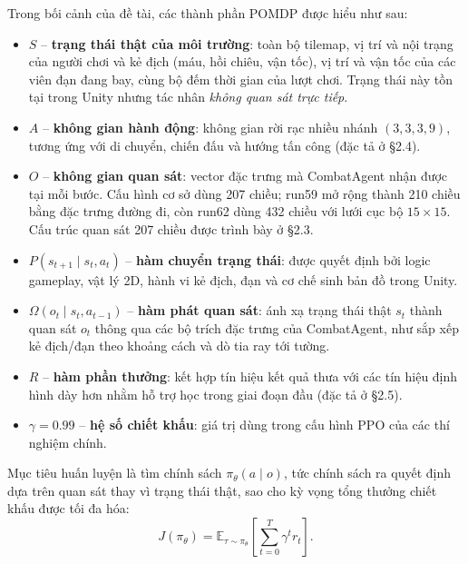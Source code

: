 Trong bối cảnh của đề tài, các thành phần POMDP được hiểu như sau:
\begin{itemize}
    \item $S$ -- \textbf{trạng thái thật của môi trường}: toàn bộ tilemap, vị trí và nội trạng của người chơi và kẻ địch (máu, hồi chiêu, vận tốc), vị trí và vận tốc của các viên đạn đang bay, cùng bộ đếm thời gian của lượt chơi. Trạng thái này tồn tại trong Unity nhưng tác nhân \emph{không quan sát trực tiếp}.
    \item $A$ -- \textbf{không gian hành động}: không gian rời rạc nhiều nhánh $(3,3,3,9)$, tương ứng với di chuyển, chiến đấu và hướng tấn công (đặc tả ở §2.4).
    \item $O$ -- \textbf{không gian quan sát}: vector đặc trưng mà CombatAgent nhận được tại mỗi bước. Cấu hình cơ sở dùng 207 chiều; run59 mở rộng thành 210 chiều bằng đặc trưng đường đi, còn run62 dùng 432 chiều với lưới cục bộ $15\times15$. Cấu trúc quan sát 207 chiều được trình bày ở §2.3.
    \item $P(s_{t+1} \mid s_t, a_t)$ -- \textbf{hàm chuyển trạng thái}: được quyết định bởi logic gameplay, vật lý 2D, hành vi kẻ địch, đạn và cơ chế sinh bản đồ trong Unity.
    \item $\Omega(o_t \mid s_t, a_{t-1})$ -- \textbf{hàm phát quan sát}: ánh xạ trạng thái thật $s_t$ thành quan sát $o_t$ thông qua các bộ trích đặc trưng của CombatAgent, như sắp xếp kẻ địch/đạn theo khoảng cách và dò tia ray tới tường.
    \item $R$ -- \textbf{hàm phần thưởng}: kết hợp tín hiệu kết quả thưa với các tín hiệu định hình dày hơn nhằm hỗ trợ học trong giai đoạn đầu (đặc tả ở §2.5).
    \item $\gamma = 0.99$ -- \textbf{hệ số chiết khấu}: giá trị dùng trong cấu hình PPO của các thí nghiệm chính.
\end{itemize}

Mục tiêu huấn luyện là tìm chính sách $\pi_{\theta}(a \mid o)$, tức chính sách ra quyết định dựa trên quan sát thay vì trạng thái thật, sao cho kỳ vọng tổng thưởng chiết khấu được tối đa hóa:
\begin{equation}
    J(\pi_\theta) = \mathbb{E}_{\tau \sim \pi_\theta}
    \left[\sum_{t=0}^{T}\gamma^t r_t\right].
\end{equation}

